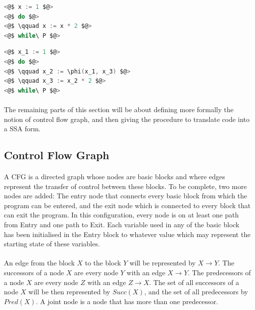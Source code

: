 \noindent\begin{minipage}{.45\textwidth}
	\begin{lstlisting}[caption={A simple while loop}, label={lst:before_phi_function}, frame=tlrb, language=C]
<@$ x := 1 $@>
<@$ do $@>
<@$ \qquad x := x * 2 $@>
<@$ while\ P $@>
	\end{lstlisting}
\end{minipage}\hfill
\begin{minipage}{.45\textwidth}
	\begin{lstlisting}[caption={Translating a while loop found in Listing~\ref{lst:before_phi_function} into a SSA form using a $\phi$ function.}, label={lst:phi_function}, frame=tlrb, language=C]
<@$ x_1 := 1 $@>
<@$ do $@>
<@$ \qquad x_2 := \phi(x_1, x_3) $@>
<@$ \qquad x_3 := x_2 * 2 $@>
<@$ while\ P $@>
	\end{lstlisting}
\end{minipage}

\paragraph{}
The remaining parts of this section will be about defining more formally the notion of control flow graph, and then giving the procedure to translate code into a SSA form.

\subsection{Control Flow Graph}
\paragraph{}
A CFG is a directed graph whose nodes are basic blocks and where edges represent the transfer of control between these blocks. To be complete, two more nodes are added: The entry node that connects every basic block from which the program can be entered, and the exit node which is connected to every block that can exit the program. In this configuration, every node is on at least one path from Entry and one path to Exit. Each variable used in any of the basic block has been initialised in the Entry block to whatever value which may represent the starting state of these variables.

\paragraph{}
An edge from the block $X$ to the block $Y$ will be represented by $X\rightarrow Y$. The successors of a node $X$ are every node $Y$ with an edge $X\rightarrow Y$. The predecessors of a node $X$ are every node $Z$ with an edge $Z\rightarrow X$. The set of all successors of a node $X$ will be then represented by $Succ(X)$, and the set of all predecessors by $Pred(X)$. A joint node is a node that has more than one predecessor.

